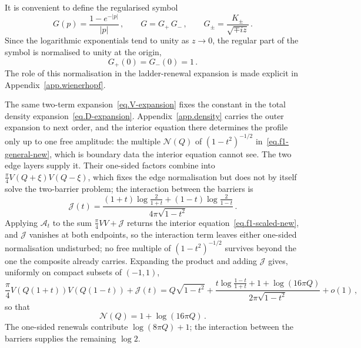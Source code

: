 \documentclass[11pt,a4paper]{article}
\theoremstyle{definition}
\begin{document}
It is convenient to define the regularised symbol
\begin{equation}\label{eq.reg_G}
    G(p) =  \frac{1-e^{-|p|}}{|p|}\, ,\qquad G = G_+\,G_-\, , \qquad G_\pm = \frac{K_\pm}{\sqrt{\mp iz}} \, .
\end{equation}
Since the logarithmic exponentials tend to unity as $z \to 0$, the regular part
of the symbol is normalised to unity at the origin,
\begin{equation}\label{eq.G-norm}
  G_+(0) = G_-(0) = 1\,.
\end{equation}
The role of this normalisation in the ladder-renewal
expansion is made explicit in Appendix~\ref{app.wienerhopf}.

\medskip
The same two-term expansion~\eqref{eq.V-expansion} fixes the constant in the
total density expansion~\eqref{eq.D-expansion}.
Appendix~\ref{app.density} carries the outer expansion to next order, and the
interior equation there determines the profile only up to one free amplitude:
the multiple $\mathcal N(Q)$ of $(1-t^2)^{-1/2}$ in~\eqref{eq.f1-general-new},
which is boundary data the interior equation cannot see.  The two edge layers
supply it.  Their one-sided factors combine into
$\frac{\pi}{4}V(Q+\xi)V(Q-\xi)$, which fixes the edge normalisation but does not
by itself solve the two-barrier problem; the interaction between the barriers is
\begin{equation}\label{eq.J-def-new}
  \mathcal J(t)=
  \frac{(1+t)\log\frac{2}{1+t}+(1-t)\log\frac{2}{1-t}}
       {4\pi\sqrt{1-t^2}}\,.
\end{equation}
Applying $\mathcal A_t$ to the sum $\frac{\pi}{4}VV+\mathcal J$ returns the
interior equation~\eqref{eq.f1-scaled-new}, and $\mathcal J$ vanishes at both
endpoints, so the interaction term leaves either one-sided normalisation
undisturbed; no free multiple of $(1-t^2)^{-1/2}$ survives beyond the one the
composite already carries.  Expanding the product and adding $\mathcal J$ gives,
uniformly on compact subsets of $(-1,1)$,
\begin{equation}\label{eq.matched-subleading-app}
  \frac\pi4V(Q(1+t))V(Q(1-t))+\mathcal J(t) =Q\sqrt{1-t^2}
  +\frac{t\log\frac{1-t}{1+t}+1+\log(16\pi Q)}
        {2\pi\sqrt{1-t^2}}+o(1)\,,
\end{equation}
so that
\begin{equation}\label{eq.K-value}
  \mathcal N(Q)=1+\log(16\pi Q)\,.
\end{equation}
The one-sided renewals contribute $\log(8\pi Q)+1$; the interaction between the
barriers supplies the remaining $\log 2$.
\end{document}
